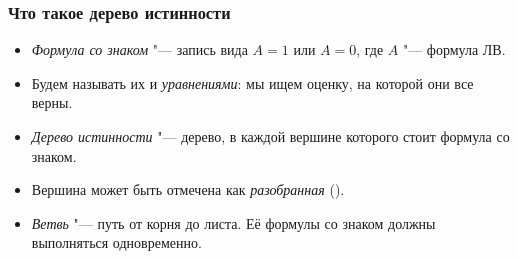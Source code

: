\begin{frame}
\frametitle{Что такое дерево истинности}
\begin{itemize}
    \item \emph{Формула со знаком} "--- запись вида $A=1$ или $A=0$, где $A$ "--- формула ЛВ.
    \item Будем называть их и \emph{уравнениями}: мы ищем оценку, на которой они все верны.
    \pause
    \item \emph{Дерево истинности} "--- дерево, в каждой вершине которого стоит формула со знаком.
    \item Вершина может быть отмечена как \emph{разобранная} (\checkmark).
    \pause
    \item \emph{Ветвь} "--- путь от корня до листа. Её формулы со знаком должны выполняться одновременно.
\end{itemize}
\end{frame}

